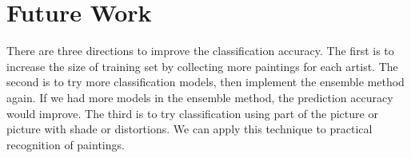 \documentclass[11pt,a4paper]{article}
\begin{document}
\section{Future Work}
There are three directions to improve the classification accuracy. The first is to increase the size of training set by collecting more paintings for each artist. The second is to try more classification models, then implement the ensemble method again. If we had more models in the ensemble method, the prediction accuracy would improve. The third is to try classification using part of the picture or picture with shade or distortions. We can apply this technique to practical recognition of paintings.




\end{document}
